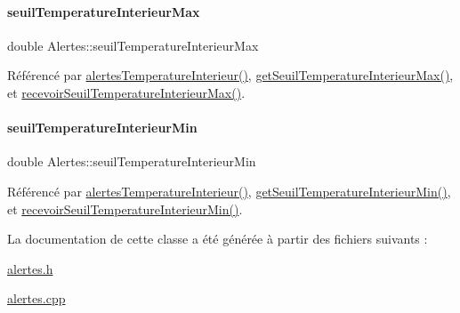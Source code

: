 \mbox{\label{class_alertes_abeda87298576a3b3eefcca9a96b8a0a9}} 
\paragraph{\texorpdfstring{seuil\+Temperature\+Interieur\+Max}{seuilTemperatureInterieurMax}}
{\footnotesize\ttfamily double Alertes\+::seuil\+Temperature\+Interieur\+Max\hspace{0.3cm}{\ttfamily [private]}}



Référencé par \hyperlink{class_alertes_a8bc56cf9eb525624b2c1f5b20f86724b}{alertes\+Temperature\+Interieur()}, \hyperlink{class_alertes_ac514ebef5e7e65aa7bee0ebe3cd7e883}{get\+Seuil\+Temperature\+Interieur\+Max()}, et \hyperlink{class_alertes_a06b136f1e86ca97978187305a11be0ff}{recevoir\+Seuil\+Temperature\+Interieur\+Max()}.

\mbox{\label{class_alertes_a1c970252300a177bef641ca5399d3783}} 
\paragraph{\texorpdfstring{seuil\+Temperature\+Interieur\+Min}{seuilTemperatureInterieurMin}}
{\footnotesize\ttfamily double Alertes\+::seuil\+Temperature\+Interieur\+Min\hspace{0.3cm}{\ttfamily [private]}}



Référencé par \hyperlink{class_alertes_a8bc56cf9eb525624b2c1f5b20f86724b}{alertes\+Temperature\+Interieur()}, \hyperlink{class_alertes_af61b11556d97f923cf7dd25ac4f5dd05}{get\+Seuil\+Temperature\+Interieur\+Min()}, et \hyperlink{class_alertes_a0e5e5177eed435d74bcbdc2a36911e52}{recevoir\+Seuil\+Temperature\+Interieur\+Min()}.



La documentation de cette classe a été générée à partir des fichiers suivants \+:\begin{DoxyCompactItemize}
\item 
\hyperlink{alertes_8h}{alertes.\+h}\item 
\hyperlink{alertes_8cpp}{alertes.\+cpp}\end{DoxyCompactItemize}
